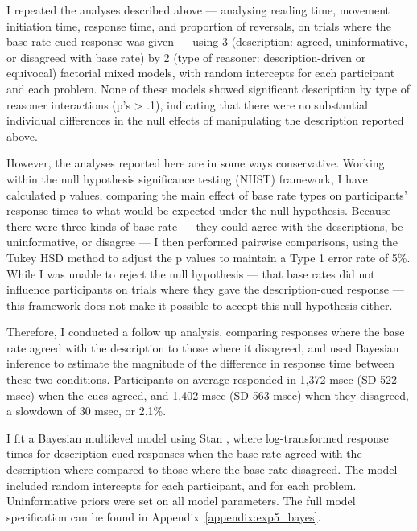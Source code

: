 I repeated the analyses described above ---
analysing reading time, movement initiation time, response time, and proportion of reversals,
on trials where the base rate-cued response was given ---
using 3 (description: agreed, uninformative, or disagreed with base rate)
by 2 (type of reasoner: description-driven or equivocal) factorial mixed models,
with random intercepts for each participant and each problem.
None of these models showed significant description by type of reasoner interactions (p's > .1),
indicating that there were no substantial individual differences in
the null effects of manipulating the description reported above.


However, the analyses reported here are in some ways conservative.
Working within the null hypothesis significance testing (NHST) framework,
I have calculated p values, comparing the main effect of base rate types
on participants' response times to what would be expected under the null hypothesis.
Because there were three kinds of base rate ---
they could agree with the descriptions, be uninformative, or disagree ---
I then performed pairwise comparisons,
using the Tukey HSD method to adjust the p values
to maintain a Type 1 error rate of 5\%.
While I was unable to reject the null hypothesis
--- that base rates did not influence participants
on trials where they gave the description-cued response ---
this framework does not make it possible to accept this null hypothesis either.

Therefore, I conducted a follow up analysis,
comparing responses where the base rate agreed with the description
to those where it disagreed,
and used Bayesian inference to estimate
the magnitude of the difference in response time between these two conditions.
Participants on average responded in 1,372 msec (SD 522 msec) when the cues agreed,
and 1,402 msec (SD 563 msec) when they disagreed, a slowdown of 30 msec, or 2.1\%.

I fit a Bayesian multilevel model using Stan 
\citep{StanDevelopmentTeam2015},
where log-transformed response times for
description-cued responses when the base rate agreed with the description
where compared to those where the base rate disagreed.
The model included random intercepts
for each participant, and for each problem.
Uninformative priors were set on all model parameters.
The full model specification can be found in Appendix~\ref{appendix:exp5_bayes}.

